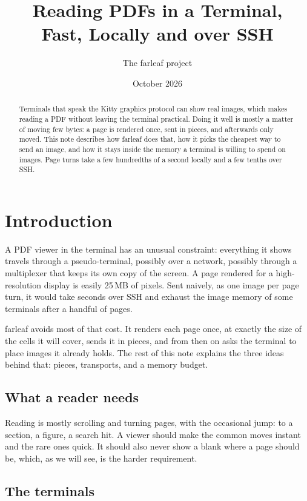 \documentclass[12pt]{article}
\title{Reading PDFs in a Terminal,\\ Fast, Locally and over SSH}
\author{The farleaf project}
\date{October 2026}
\begin{document}
\maketitle

\begin{abstract}
\noindent
Terminals that speak the Kitty graphics protocol can show real images, which
makes reading a PDF without leaving the terminal practical. Doing it well is
mostly a matter of moving few bytes: a page is rendered once, sent in pieces,
and afterwards only moved. This note describes how farleaf does that, how it
picks the cheapest way to send an image, and how it stays inside the memory a
terminal is willing to spend on images. Page turns take a few hundredths of a
second locally and a few tenths over SSH.
\end{abstract}

\section{Introduction}

A PDF viewer in the terminal has an unusual constraint: everything it shows
travels through a pseudo-terminal, possibly over a network, possibly through a
multiplexer that keeps its own copy of the screen. A page rendered for a
high-resolution display is easily 25\,MB of pixels. Sent naively, as one image
per page turn, it would take seconds over SSH and exhaust the image memory of
some terminals after a handful of pages.

farleaf avoids most of that cost. It renders each page once, at exactly the
size of the cells it will cover, sends it in pieces, and from then on asks the
terminal to place images it already holds. The rest of this note explains the
three ideas behind that: pieces, transports, and a memory budget.

\subsection{What a reader needs}

Reading is mostly scrolling and turning pages, with the occasional jump: to a
section, a figure, a search hit. A viewer should make the common moves instant
and the rare ones quick. It should also never show a blank where a page
should be, which, as we will see, is the harder requirement.

\subsection{The terminals}
\end{document}
